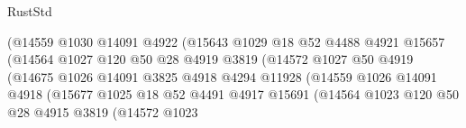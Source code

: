 \begin{lexlean}{RustStd}
\begin{coremodule}
                                      (@14559
                                        @1030
                                        @14091
                                        @4922
                                        (@15643
                                          @1029
                                          @18
                                          @52
                                          @4488
                                          @4921
                                          @15657
                                          (@14564
                                            @1027
                                            @120
                                            @50
                                            @28
                                            @4919
                                            @3819
                                            (@14572
                                              @1027
                                              @50
                                              @4919
                                              (@14675
                                                @1026
                                                @14091
                                                @3825
                                                @4918
                                                @4294
                                                @11928
                                                (@14559
                                                  @1026
                                                  @14091
                                                  @4918
                                                  (@15677
                                                    @1025
                                                    @18
                                                    @52
                                                    @4491
                                                    @4917
                                                    @15691
                                                    (@14564
                                                      @1023
                                                      @120
                                                      @50
                                                      @28
                                                      @4915
                                                      @3819
                                                      (@14572
                                                        @1023

\end{coremodule}
\end{lexlean}

